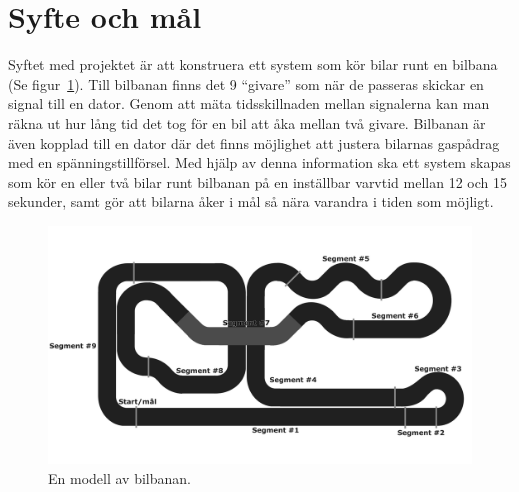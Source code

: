 \section{Syfte och mål}

Syftet med projektet är att konstruera ett system som kör bilar runt en bilbana
(Se figur~\ref{fig:track_modell}). Till bilbanan finns det 9 ``givare'' som när
de passeras skickar en signal till en dator. Genom att mäta tidsskillnaden
mellan signalerna kan man räkna ut hur lång tid det tog för en bil att åka
mellan två givare. Bilbanan är även kopplad till en dator där det finns
möjlighet att justera bilarnas gaspådrag med en spänningstillförsel. Med hjälp
av denna information ska ett system skapas som kör en eller två bilar runt
bilbanan på en inställbar varvtid mellan 12 och 15 sekunder, samt gör att
bilarna åker i mål så nära varandra i tiden som möjligt.

\begin{figure}
  \centering
  \includegraphics[width=\linewidth]{figures/BanaModell.pdf}
  \caption{En modell av bilbanan.}%
  \label{fig:track_modell}
\end{figure}

